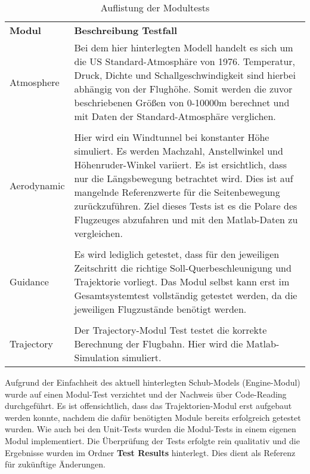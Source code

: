 \begin{table}[h]
\centering	\begin{tabular}{l p{12cm}}
		\textbf{Modul} & \textbf{Beschreibung Testfall}\\
		Atmosphere & Bei dem hier hinterlegten Modell  handelt es sich um die US Standard-Atmosphäre von 1976.  Temperatur, Druck, Dichte und Schallgeschwindigkeit sind hierbei abhängig von der Flughöhe. Somit werden die zuvor beschriebenen Größen von 0-10000m berechnet und mit Daten der Standard-Atmosphäre verglichen.\\\\
		Aerodynamic & Hier wird ein Windtunnel bei konstanter Höhe simuliert. Es werden Machzahl, Anstellwinkel und Höhenruder-Winkel variiert. Es ist ersichtlich, dass nur die Längsbewegung betrachtet wird. Dies ist auf mangelnde Referenzwerte für die Seitenbewegung zurückzuführen. Ziel dieses Tests ist es die Polare des Flugzeuges abzufahren und mit den Matlab-Daten zu vergleichen. \\\\
		Guidance &  Es wird lediglich getestet, dass für den jeweiligen Zeitschritt die richtige Soll-Querbeschleunigung und Trajektorie vorliegt. Das Modul selbst kann erst im Gesamtsystemtest vollständig getestet werden, da die jeweiligen Flugzustände benötigt werden.\\\\
		Trajectory & Der Trajectory-Modul Test testet die korrekte Berechnung der Flugbahn. Hier wird die Matlab-Simulation simuliert. 
	\end{tabular}
\caption{Auflistung der Modultests}
\label{tab:modultests}
\end{table}
\newpage
Aufgrund der Einfachheit des aktuell hinterlegten Schub-Models (Engine-Modul) wurde auf einen Modul-Test verzichtet und der Nachweis über Code-Reading durchgeführt.
Es ist offensichtlich, dass das Trajektorien-Modul erst aufgebaut werden konnte, nachdem die dafür benötigten Module bereits erfolgreich getestet wurden. Wie auch bei den Unit-Tests wurden die Modul-Tests in einem eigenen Modul implementiert. Die Überprüfung der Tests erfolgte rein qualitativ und die Ergebnisse  wurden im Ordner \textbf{Test Results} hinterlegt. Dies dient als Referenz für zukünftige Änderungen. 


